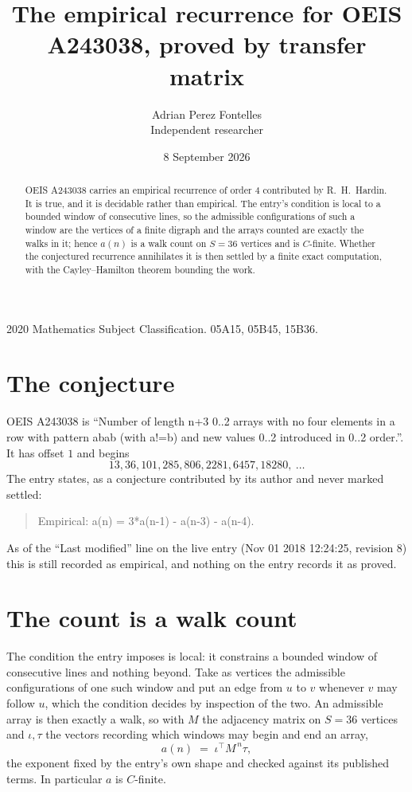 \documentclass[11pt,a4paper]{article}
\title{The empirical recurrence for OEIS A243038, proved by transfer matrix}
\author{Adrian Perez Fontelles\\ \small Independent researcher}
\date{8 September 2026}
\theoremstyle{plain}
\theoremstyle{definition}
\begin{document}
\maketitle

\begin{abstract}
OEIS A243038 carries an empirical recurrence of order $4$ contributed by R.~H.~Hardin. It is
true, and it is decidable rather than empirical. The entry's condition is local to a bounded window of consecutive lines, so
the admissible configurations of such a window are the vertices of a finite digraph and the
arrays counted are exactly the walks in it; hence $a(n)$ is a walk count on $S=36$ vertices
and is $C$-finite. Whether the conjectured recurrence annihilates it is then settled by a
finite exact computation, with the Cayley--Hamilton theorem bounding the work.
\end{abstract}

\noindent\small 2020 Mathematics Subject Classification. 05A15, 05B45, 15B36.\normalsize

\section{The conjecture}

OEIS A243038 is ``Number of length n+3 0..2 arrays with no four elements in a row with pattern abab (with a!=b) and new values 0..2 introduced in 0..2 order.''. It has offset $1$ and begins
\[
13, 36, 101, 285, 806, 2281, 6457, 18280,\ \dots
\]
The entry states, as a conjecture contributed by its author and never marked settled:
\begin{quote}
Empirical: a(n) = 3*a(n-1) - a(n-3) - a(n-4).
\end{quote}
As of the ``Last modified'' line on the live entry (Nov 01 2018 12:24:25, revision 8) this is still
recorded as empirical, and nothing on the entry records it as proved.

\section{The count is a walk count}

The condition the entry imposes is local: it constrains a bounded window of consecutive lines and nothing beyond. Take as
vertices the admissible configurations of one such window and put an edge from $u$ to $v$
whenever $v$ may follow $u$, which the condition decides by inspection of the two. An
admissible array is then exactly a walk, so with $M$ the adjacency matrix on $S=36$ vertices
and $\iota,\tau$ the vectors recording which windows may begin and end an array,
\[
a(n)\;=\;\iota^{\!\top}M^{\,n}\tau ,
\]
the exponent fixed by the entry's own shape and checked against its published terms. In
particular $a$ is $C$-finite.
\end{document}
